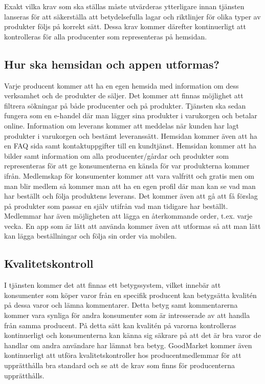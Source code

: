 \documentclass[10pt,a4paper,oneside]{article}
\begin{document}
Exakt vilka krav som ska ställas måste utvärderas ytterligare innan tjänsten lanseras för att säkerställa att betydelsefulla lagar och riktlinjer för olika typer av produkter följs på korrekt sätt. Dessa krav kommer därefter kontinuerligt att kontrolleras för alla producenter som representeras på hemsidan. 

\subsection{Hur ska hemsidan och appen utformas?}
Varje producent kommer att ha en egen hemsida med information om dess verksamhet och de produkter de säljer. Det kommer att finnas möjlighet att filtrera sökningar på både producenter och på produkter. Tjänsten ska sedan fungera som en e-handel där man lägger sina produkter i varukorgen och betalar online. Information om leverans kommer att meddelas när kunden har lagt produkter i varukorgen och bestämt leveranssätt. Hemsidan kommer även att ha en FAQ sida samt kontaktuppgifter till en kundtjänst. Hemsidan kommer att ha bilder samt information om alla producenter/gårdar och produkter som representeras för att ge konsumenterna en känsla för var produkterna kommer ifrån. Medlemskap för konsumenter kommer att vara valfritt och gratis men om man blir medlem så kommer man att ha en egen profil där man kan se vad man har beställt och följa produktens leverans. Det kommer även att gå att få förslag på produkter som passar en själv utifrån vad man tidigare har beställt. Medlemmar har även möjligheten att lägga en återkommande order, t.ex. varje vecka. En app som är lätt att använda kommer även att utformas så att man lätt kan lägga beställningar och följa sin order via mobilen.  


\subsection{Kvalitetskontroll}
I tjänsten kommer det att finnas ett betygssystem, vilket innebär att konsumenter som köper varor från en specifik producent kan betygsätta kvalitén på dessa varor och lämna kommentarer. Detta betyg samt kommentarerna kommer vara synliga för andra konsumenter som är intresserade av att handla från samma producent. På detta sätt kan kvalitén på varorna kontrolleras kontinuerligt och konsumenterna kan känna sig säkrare på att det är bra varor de handlar om andra användare har lämnat bra betyg. GoodMarket kommer även kontinuerligt att utföra kvalitetskontroller hos producentmedlemmar för att upprätthålla bra standard och se att de krav som finns för producenterna upprätthålls. 
\end{document}
